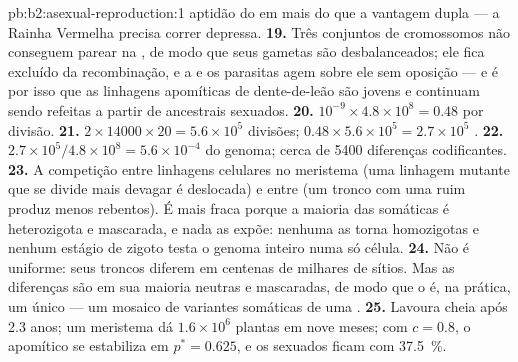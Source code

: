 \begin{solution}{pb:b2:asexual-reproduction:1}
aptidão do  em mais do que a vantagem dupla --- a Rainha Vermelha
precisa correr depressa.
\textbf{19.} Três conjuntos de cromossomos não conseguem parear na
, de modo que seus gametas são desbalanceados; ele fica excluído
da recombinação, e a  e os parasitas agem sobre ele
sem oposição --- e é por isso que as linhagens apomíticas de
dente-de-leão são jovens e continuam sendo refeitas a partir de
ancestrais sexuados.
\textbf{20.} $10^{-9}\times 4.8\times 10^{8} = 0.48$ por divisão.
\textbf{21.} $2\times \num{14000}\times 20 = 5.6\times 10^{5}$
divisões; $0.48\times 5.6\times 10^{5} = 2.7\times 10^{5}$
.
\textbf{22.} $2.7\times 10^{5}/4.8\times 10^{8} = 5.6\times 10^{-4}$ do
genoma; cerca de \num{5400} diferenças codificantes.
\textbf{23.} A competição entre linhagens celulares no meristema (uma
linhagem mutante que se divide mais devagar é deslocada) e entre
 (um tronco com uma  ruim produz menos rebentos). É mais
fraca porque a maioria das  somáticas é heterozigota e
mascarada, e nada as expõe: nenhuma  as torna homozigotas e
nenhum estágio de zigoto  testa o genoma inteiro numa só
célula.
\textbf{24.} Não é uniforme: seus troncos diferem em centenas de
milhares de sítios. Mas as diferenças são em sua maioria neutras e
mascaradas, de modo que o  é, na prática, um único  --- um
mosaico de variantes somáticas de uma .
\textbf{25.} Lavoura cheia após 2.3 anos; um meristema dá
$1.6\times 10^{6}$ plantas em nove meses; com $c = 0.8$, o apomítico
se estabiliza em $p^* = 0.625$, e os sexuados ficam com
\qty{37.5}{\%}.
\end{solution}
